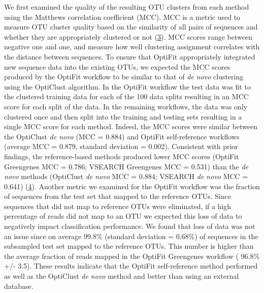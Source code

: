 \documentclass[
]{article}
\begin{document}
We first examined the quality of the resulting OTU clusters from each
method using the Matthews correlation coefficient (MCC). MCC is a metric
used to measure OTU cluster quality based on the similarity of all pairs
of sequences and whether they are appropriately clustered or not
(\protect\hyperlink{ref-westcott2015}{3}). MCC scores range between
negative one and one, and measure how well clustering assignment
correlates with the distance between sequences. To ensure that OptiFit
appropriately integrated new sequence data into the existing OTUs, we
expected the MCC scores produced by the OptiFit workflow to be similar
to that of \emph{de novo} clustering using the OptiClust algorithm. In
the OptiFit workflow the test data was fit to the clustered training
data for each of the 100 data splits resulting in an MCC score for each
split of the data. In the remaining workflows, the data was only
clustered once and then split into the training and testing sets
resulting in a single MCC score for each method. Indeed, the MCC scores
were similar between the OptiClust \emph{de novo} (MCC = 0.884) and
OptiFit self-reference workflows (average MCC = 0.879, standard
deviation = 0.002). Consistent with prior findings, the reference-based
methods produced lower MCC scores (OptiFit Greengenes MCC = 0.786;
VSEARCH Greengenes MCC = 0.531) than the \emph{de novo} methods
(OptiClust \emph{de novo} MCC = 0.884; VSEARCH \emph{de novo} MCC =
0.641) (\protect\hyperlink{ref-sovacool2022}{4}). Another metric we
examined for the OptiFit workflow was the fraction of sequences from the
test set that mapped to the reference OTUs. Since sequences that did not
map to reference OTUs were eliminated, if a high percentage of reads did
not map to an OTU we expected this loss of data to negatively impact
classification performance. We found that loss of data was not an issue
since on average 99.8\% (standard deviation = 0.68\%) of sequences in
the subsampled test set mapped to the reference OTUs. This number is
higher than the average fraction of reads mapped in the OptiFit
Greengenes workflow ( 96.8\% +/- 3.5). These results indicate that the
OptiFit self-reference method performed as well as the OptiClust
\emph{de novo} method and better than using an external database.
\end{document}
